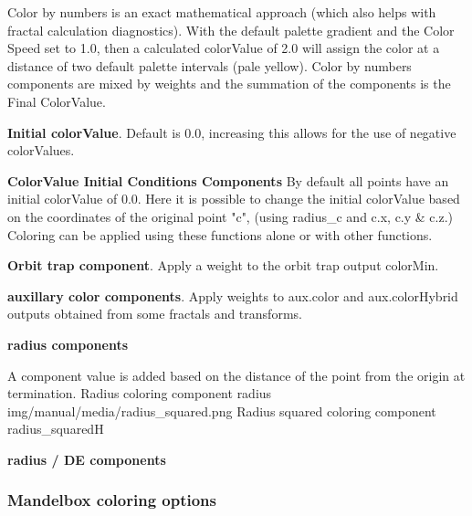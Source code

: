 Color by numbers is an exact mathematical approach (which also helps with fractal calculation diagnostics).
With the default palette gradient and the Color Speed set to 1.0, then a calculated colorValue of 2.0 will assign the color at a distance of two default palette intervals (pale yellow).
Color by numbers components are mixed by weights and the summation of the components is the Final ColorValue.

\textbf{Initial colorValue}. Default is 0.0, increasing this allows for the use of negative colorValues.

\textbf{ColorValue Initial Conditions Components}
By default all points have an initial colorValue of 0.0. Here it is possible to change the initial colorValue  based on the coordinates of the original point "c", (using radius_c and c.x, c.y & c.z.) Coloring can be applied using these functions alone or with other functions.

\textbf{Orbit trap component}. Apply a weight to the orbit trap output colorMin.

\textbf{auxillary color components}. Apply weights to aux.color and aux.colorHybrid outputs obtained from some fractals and transforms.

\textbf{radius components} 

A component value is added based on the distance of the point from the origin at termination.
{Radius coloring component}
{radius}
{img/manual/media/radius_squared.png}
{Radius squared coloring component}
{radius_squared}{H}

\textbf{radius / DE components}

\subsubsection{Mandelbox coloring options}\label{materials-mandelbox}





